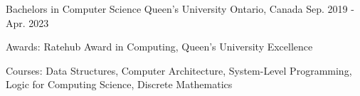 

\begin{cventries}

  \cventry
    {Bachelors in Computer Science} %
    {Queen's University} %
    {Ontario, Canada} %
    {Sep. 2019 - Apr. 2023} %
    {
      \begin{cvitems} %
        \item {Awards: Ratehub Award in Computing, Queen’s University Excellence}
        \item {Courses: Data Structures, Computer Architecture, System-Level Programming, Logic for Computing Science, Discrete Mathematics}
      \end{cvitems}
    }

\end{cventries}
